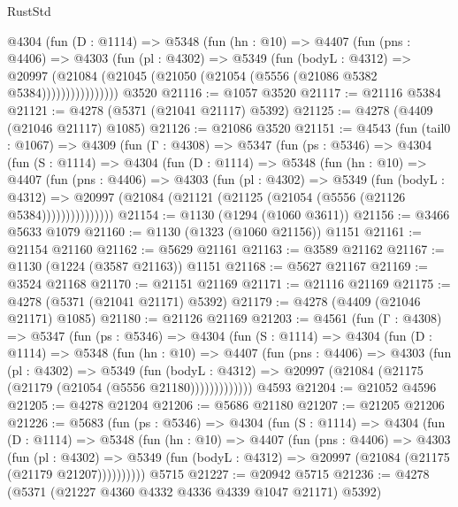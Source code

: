 \begin{lexlean}{RustStd}
\begin{coremodule}
            @4304
              (fun (D : @1114) =>
              @5348
                (fun (hn : @10) =>
                @4407
                  (fun (pns : @4406) =>
                  @4303
                    (fun (pl : @4302) =>
                    @5349
                      (fun (bodyL : @4312) =>
                      @20997
                        (@21084 (@21045 (@21050 (@21054 (@5556 (@21086 @5382 @5384))))))))))))))))
    @3520
@21116 := @1057 @3520
@21117 := @21116 @5384
@21121 := @4278 (@5371 (@21041 @21117) @5392)
@21125 := @4278 (@4409 (@21046 @21117) @1085)
@21126 := @21086 @3520
@21151 := @4543
    (fun (tail0 : @1067) =>
    @4309
      (fun (Γ : @4308) =>
      @5347
        (fun (ps : @5346) =>
        @4304
          (fun (S : @1114) =>
          @4304
            (fun (D : @1114) =>
            @5348
              (fun (hn : @10) =>
              @4407
                (fun (pns : @4406) =>
                @4303
                  (fun (pl : @4302) =>
                  @5349
                    (fun (bodyL : @4312) =>
                    @20997 (@21084 (@21121 (@21125 (@21054 (@5556 (@21126 @5384)))))))))))))))
@21154 := @1130 (@1294 (@1060 @3611))
@21156 := @3466 @5633 @1079
@21160 := @1130 (@1323 (@1060 @21156)) @1151
@21161 := @21154 @21160
@21162 := @5629 @21161
@21163 := @3589 @21162
@21167 := @1130 (@1224 (@3587 @21163)) @1151
@21168 := @5627 @21167
@21169 := @3524 @21168
@21170 := @21151 @21169
@21171 := @21116 @21169
@21175 := @4278 (@5371 (@21041 @21171) @5392)
@21179 := @4278 (@4409 (@21046 @21171) @1085)
@21180 := @21126 @21169
@21203 := @4561
    (fun (Γ : @4308) =>
    @5347
      (fun (ps : @5346) =>
      @4304
        (fun (S : @1114) =>
        @4304
          (fun (D : @1114) =>
          @5348
            (fun (hn : @10) =>
            @4407
              (fun (pns : @4406) =>
              @4303
                (fun (pl : @4302) =>
                @5349
                  (fun (bodyL : @4312) =>
                  @20997 (@21084 (@21175 (@21179 (@21054 (@5556 @21180)))))))))))))
    @4593
@21204 := @21052 @4596
@21205 := @4278 @21204
@21206 := @5686 @21180
@21207 := @21205 @21206
@21226 := @5683
    (fun (ps : @5346) =>
    @4304
      (fun (S : @1114) =>
      @4304
        (fun (D : @1114) =>
        @5348
          (fun (hn : @10) =>
          @4407
            (fun (pns : @4406) =>
            @4303
              (fun (pl : @4302) =>
              @5349 (fun (bodyL : @4312) => @20997 (@21084 (@21175 (@21179 @21207))))))))))
    @5715
@21227 := @20942 @5715
@21236 := @4278 (@5371 (@21227 @4360 @4332 @4336 @4339 @1047 @21171) @5392)

\end{coremodule}
\end{lexlean}
